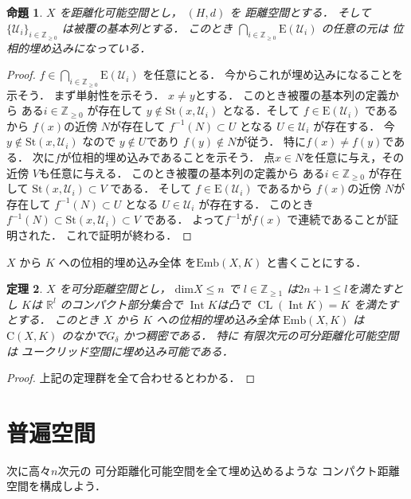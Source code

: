 \documentclass[leqno, a4paper, 12pt]{jsarticle}
\newtheorem{thm}{定理}
\newtheorem{prop}[thm]{命題}
\newcommand{\zz}{\mathbb{Z}}
\newcommand{\rr}{\mathbb{R}}
\DeclareMathOperator{\cl}{CL}
\DeclareMathOperator{\nai}{Int}
\newcommand{\yodim}{\mathrm{dim}}
\newcommand{\yocovf}[1]{\mathcal{#1}}
\newcommand{\yostset}[1]{\mathrm{St}(#1)}
\newcommand{\yofuncsp}[2]{\mathrm{C}(#1, #2)}
\newcommand{\yofsusm}[1]{\mathrm{E}(#1)}
\newcommand{\yoemb}[2]{\mathrm{Emb}(#1, #2)}
\numberwithin{equation}{section}
\begin{document}
\begin{prop}\label{prop:umekomi}
$X$
を距離化可能空間とし，
$(H, d)$
を
距離空間とする．
そして
$\{\yocovf{U}_{i}\}_{i\in \zz_{\ge0}}$
は被覆の基本列とする．
このとき
$\bigcap_{i\in \zz_{\ge 0}}\yofsusm{\yocovf{U}_{i}}$
の任意の元は
位相的埋め込みになっている．
\end{prop}
\begin{proof}
$f\in \bigcap_{i\in \zz_{\ge 0}}\yofsusm{\yocovf{U}_{i}}$
を任意にとる．
今からこれが埋め込みになることを示そう．
まず単射性を示そう．
$x\neq y$とする．
このとき被覆の基本列の定義から
ある$i\in \zz_{\ge 0}$
が存在して
$y\not \in \yostset{x, \yocovf{U}_{i}}$
となる．そして
$f\in \yofsusm{\yocovf{U}_{i}}$
であるから
$f(x)$の近傍
$N$が存在して
$f^{-1}(N)\subset U$
となる
$U\in \yocovf{U}_{i}$
が存在する．
今$y\not \in \yostset{x, \yocovf{U}_{i}}$
なので $y\not \in U$であり
$f(y)\not \in N$が従う．
特に$f(x)\neq f(y)$である．
次に$f$が位相的埋め込みであることを示そう．
点$x\in N$を任意に与え，その近傍
$V$も任意に与える．
このとき被覆の基本列の定義から
ある$i\in \zz_{\ge 0}$
が存在して
$\yostset{x, \yocovf{U}_{i}}\subset V$
である．
そして
$f\in \yofsusm{\yocovf{U}_{i}}$
であるから
$f(x)$の近傍
$N$が存在して
$f^{-1}(N)\subset U$
となる
$U\in \yocovf{U}_{i}$
が存在する．
このとき
$f^{-1}(N)\subset \yostset{x, \yocovf{U}_{i}}\subset V$
である．
よって$f^{-1}$が$f(x)$
で連続であることが証明された．
これで証明が終わる．
\end{proof}

$X$
から
$K$
への位相的埋め込み全体
を$\yoemb{X}{K}$
と書くことにする．

\begin{thm}\label{thm:umekomidense}
$X$
を可分距離空間とし，
$\yodim X\le n$
で
$l\in \zz_{\ge 1}$
は$2n+1\le l$を満たすとし
$K$は
$\rr^{l}$
のコンパクト部分集合で
$\nai K$は凸で
$\cl (\nai K)=K$
を満たすとする．
このとき
$X$
から
$K$
への位相的埋め込み全体
$\yoemb{X}{K}$
は
$\yofuncsp{X}{K}$
のなかで$G_{\delta}$
かつ稠密である．
特に
有限次元の可分距離化可能空間は
ユークリッド空間に埋め込み可能である．
\end{thm}
\begin{proof}
上記の定理群を全て合わせるとわかる．
\end{proof}

\section{普遍空間}

次に高々$n$次元の
可分距離化可能空間を全て埋め込めるような
コンパクト距離空間を構成しよう．
\end{document}
